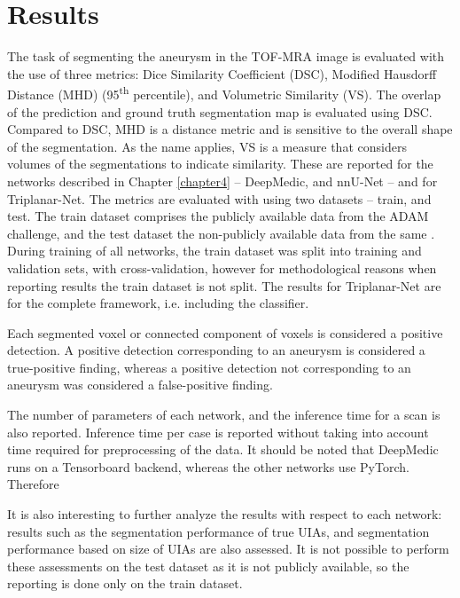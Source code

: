 \chapter{Results}
\label{chapter6}

The task of segmenting the aneurysm in the TOF-MRA image is evaluated with the use of three metrics: Dice Similarity Coefficient (DSC), Modified Hausdorff Distance (MHD) (95\textsuperscript{th} percentile), and Volumetric Similarity (VS). The overlap of the prediction and ground truth segmentation map is evaluated using DSC. Compared to DSC, MHD is a distance metric and is sensitive to the overall shape of the segmentation. As the name applies, VS is a measure that considers volumes of the segmentations to indicate similarity. These are reported for the networks described in Chapter \ref{chapter4} -- DeepMedic, and nnU-Net -- and for Triplanar-Net. The metrics are evaluated with using two datasets -- train, and test. The train dataset comprises the publicly available data from the ADAM challenge, and the test dataset the non-publicly available data from the same \cite{Timmins2020}. During training of all networks, the train dataset was split into training and validation sets, with cross-validation, however for methodological reasons when reporting results the train dataset is not split. The results for Triplanar-Net are for the complete framework, i.e. including the classifier.

Each segmented voxel or connected component of voxels is considered a positive detection. A positive detection corresponding to an aneurysm is considered a true-positive finding, whereas a positive detection not corresponding to an aneurysm was considered a false-positive finding. 

The number of parameters of each network, and the inference time for a scan is also reported. Inference time per case is reported without taking into account time required for preprocessing of the data. It should be noted that DeepMedic runs on a Tensorboard backend, whereas the other networks use PyTorch. Therefore 

It is also interesting to further analyze the results with respect to each network: results such as the segmentation performance of true UIAs, and segmentation performance based on size of UIAs are also assessed. It is not possible to perform these assessments on the test dataset as it is not publicly available, so the reporting is done only on the train dataset. 

